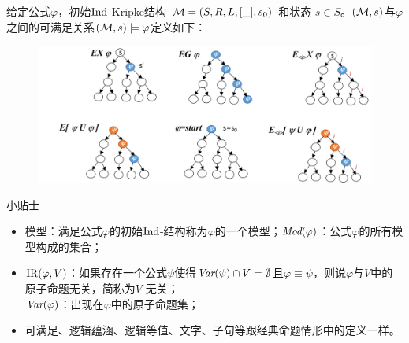 \documentclass[9pt, CJK]{beamer}
\begin{document}
\begin{frame}
{\begin{definition}
				给定公式$\varphi$，初始$\textrm{Ind}$-Kripke结构 ${\cal M}=(S,R,L,[\_],s_0)$ 和状态 $s\in S$。$({\cal M},s)$与$\varphi$之间的可满足关系$({\cal M},s)\models \varphi$定义如下：
				\begin{figure}
					\includegraphics[scale=0.3]{figures/semanticCTL}
				\end{figure}
			\end{definition}%
			\begin{block}{{\footnotesize 小贴士}}
				\tiny{
					\begin{itemize}
						\item \textcolor{blue!80}{模型}：满足公式$\varphi$的初始$\textrm{Ind}$-结构称为$\varphi$的一个模型；\qquad $\textit{Mod}(\varphi)$：公式$\varphi$的所有模型构成的集合； 
						\item \textcolor{blue!80}{$\textrm{IR}(\varphi,V)$}：如果存在一个公式$\psi$使得$\textit{Var}(\psi) \cap V = \emptyset$且$\varphi \equiv \psi$，则说$\varphi$与$V$中的原子命题\textcolor{blue!80}{无关}，简称为\textcolor{blue!80}{$V$-无关}；\\ $\textit{Var}(\varphi)$：出现在$\varphi$中的原子命题集；
						\item 可满足、逻辑蕴涵、逻辑等值、文字、子句等跟经典命题情形中的定义一样。
					\end{itemize}
				}
			\end{block}
}
\end{frame}
\end{document}
